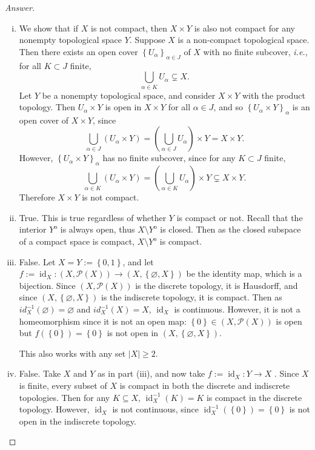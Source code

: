 \documentclass[12pt]{article}
\newcommand{\ita}[1]{\textit{#1}}
\newcommand\inv[1]{#1^{-1}}
\newcommand\paren[1]{\left( #1 \right)}
\newcommand\setb[1]{\left \{ #1 \right \}}
\theoremstyle{definition}
\DeclareMathOperator\id{id}
\begin{document}
\begin{proof}[Answer]
    \noindent
    \begin{enumerate}[(i)]
        \item We show that if $X$ is not compact, then $X \times Y$ is also not compact for any nonempty topological space $Y$. Suppose $X$ is a non-compact topological space. Then there exists an open cover $\setb{ U_{\alpha} }_{\alpha \in J}$ of $X$ with no finite subcover, \ita{i.e.}, for all $K \subset J$ finite,
        \[
            \bigcup\limits_{\alpha \in K} U_{\alpha} \subsetneq X.
        \]
        Let $Y$ be a nonempty topological space, and consider $X \times Y$ with the product topology. Then $U_{\alpha} \times Y$ is open in $X \times Y$ for all $\alpha \in J$, and so $\setb{ U_{\alpha} \times Y }_{\alpha}$ is an open cover of $X \times Y$, since
        \[
            \bigcup\limits_{\alpha \in J} \paren{ U_{\alpha} \times Y } = \paren{ \bigcup\limits_{\alpha \in J} U_{\alpha} } \times Y = X \times Y.
        \]
        However, $\setb{ U_{\alpha} \times Y }_{\alpha}$ has no finite subcover, since for any $K \subset J$ finite,
        \[
            \bigcup\limits_{\alpha \in K} \paren{ U_{\alpha} \times Y } = \paren{ \bigcup\limits_{\alpha \in K} U_{\alpha} } \times Y \subsetneq X \times Y.
        \]
        Therefore $X \times Y$ is not compact.
        \item True. This is true regardless of whether $Y$ is compact or not. Recall that the interior $Y^{\mathrm{o}}$ is always open, thus $X \setminus Y^{\mathrm{o}}$ is closed. Then as the closed subspace of a compact space is compact, $X \setminus Y^{\mathrm{o}}$ is compact.
        \item False. Let $X = Y := \setb{ 0 , 1 }$, and let $f := \id_{X} : \paren{ X , \mathcal{P}(X) } \to \paren{ X , \setb{ \varnothing , X } }$ be the identity map, which is a bijection. Since $\paren{ X , \mathcal{P}(X) }$ is the discrete topology, it is Hausdorff, and since $\paren{ X , \setb{ \varnothing , X } }$ is the indiscrete topology, it is compact. Then as $\inv{id_{X}} \paren{ \varnothing } = \varnothing$ and $\inv{id_{X}} \paren{X} = X$, $\id_X$ is continuous. However, it is not a homeomorphism since it is not an open map: $\setb{ 0 } \in \paren{ X , \mathcal{P}(X) }$ is open but $f \paren{ \setb{ 0 } } = \setb{ 0 }$ is not open in $\paren{ X , \setb{ \varnothing , X } }$.
        
        This also works with any set $|X| \geq 2$. 
        \item False. Take $X$ and $Y$ as in part (iii), and now take $f := \id_X : Y \to X$ . Since $X$ is finite, every subset of $X$ is compact in both the discrete and indiscrete topologies. Then for any $K \subseteq X$, $\inv{\id_{X}}(K) = K$ is compact in the discrete topology. However, $\id_X$ is not continuous, since $\inv{\id_X} \paren{ \setb{ 0 } } = \setb{ 0 }$ is not open in the indiscrete topology.
    \end{enumerate}
\end{proof}
\end{document}
